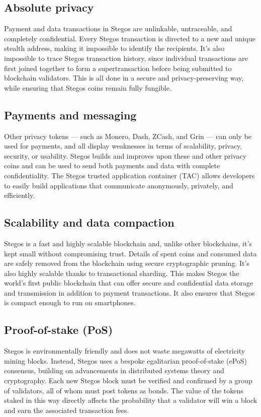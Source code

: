 \documentclass[8pt,fleqn,openany]{book}
\begin{document}
\subsection{Absolute privacy}
Payment and data transactions in Stegos are unlinkable, untraceable, and completely confidential. Every Stegos transaction is directed to a new and unique stealth address, making it impossible to identify the recipients. It’s also impossible to trace Stegos transaction history, since individual transactions are first joined together to form a supertransaction before being submitted to blockchain validators. This is all done in a secure and privacy-preserving way, while ensuring that Stegos coins remain fully fungible.

\subsection{Payments and messaging}
Other privacy tokens — such as Monero, Dash, ZCash, and Grin — can only be used for payments, and all display weaknesses in terms of scalability, privacy, security, or usability. Stegos builds and improves upon these and other privacy coins and can be used to send both payments and data with complete confidentiality. The Stegos trusted application container (TAC) allows developers to easily build applications that communicate anonymously, privately, and efficiently.

\subsection{Scalability and data compaction}
Stegos is a fast and highly scalable blockchain and, unlike other blockchains, it’s kept small without compromising trust. Details of spent coins and consumed data are safely removed from the blockchain using secure cryptographic pruning. It's also highly scalable thanks to transactional sharding. This makes Stegos the world’s first public blockchain that can offer secure and confidential data storage and transmission in addition to payment transactions. It also ensures that Stegos is compact enough to run on smartphones.

\subsection{Proof-of-stake (PoS)}
Stegos is environmentally friendly and does not waste megawatts of electricity mining blocks. Instead, Stegos uses a bespoke egalitarian proof-of-stake (ePoS) consensus, building on advancements in distributed systems theory and cryptography. Each new Stegos block must be verified and confirmed by a group of validators, all of whom must post tokens as bonds. The value of the tokens staked in this way directly affects the probability that a validator will win a block and earn the associated transaction fees.
\end{document}
